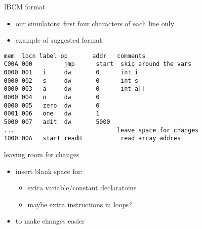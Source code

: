 \begin{frame}[fragile,label=ibcmFormat]{IBCM format}
    \begin{itemize}
    \item our simulators: first four characters of each line only
    \item example of suggested format:
    \end{itemize}
\begin{Verbatim}[fontsize=\small]
mem  locn label op       addr   comments
C00A 000         jmp      start  skip around the vars
0000 001   i     dw       0      int i
0000 002   s     dw       0      int s
0000 003   a     dw       0      int a[]
0000 004   n     dw       0
0000 005   zero  dw       0
0001 006   one   dw       1
5000 007   adit  dw       5000
...                             leave space for changes
1000 00A   start readH           read array addres
\end{Verbatim}
\end{frame}

\begin{frame}{leaving room for changes}
    \begin{itemize}
    \item insert blank space for:
        \begin{itemize}
        \item extra variable/constant declaratoins
        \item maybe extra instructions in loops?
        \end{itemize}
    \item to make changes easier
    \end{itemize}
\end{frame}
